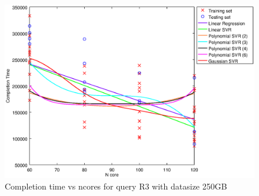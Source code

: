 
\begin {figure}[hbtp]
\centering
\includegraphics[width=\textwidth]{output/R3_250_ONLY_1_LINEAR_NCORE/plot_R3_250.eps}
\caption{Completion time vs ncores for query R3 with datasize 250GB}
\label{fig:only_1_linear_R3_250}
\end {figure}
